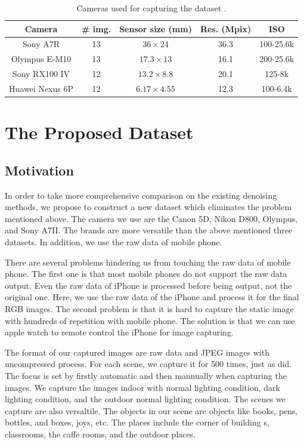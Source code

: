 \begin{table}[ht!]
\caption{Cameras used for capturing the dataset \cite{dnd2017}.}
\vspace{-5mm}
\label{tab6-3}
\begin{center}
\small
\renewcommand\arraystretch{1.2}
\begin{tabular*}{1\textwidth}{@{\extracolsep{\fill}}ccccc}
\hline
Camera
&
\# img.
&
Sensor size (mm)
&
Res. (Mpix)
&
ISO
\\
\hline
Sony A7R & 13  & $36\times24$  & 36.3  & 100-25.6k
\\
\hline
Olympus E-M10 & 13  & $17.3\times13$  & 16.1  & 200-25.6k 
\\
\hline   
Sony RX100 IV & 12 & $13.2\times8.8$  & 20.1  & 125-8k 
\\
\hline   
Huawei Nexus 6P & 12 & $6.17\times4.55$  & 12.3  & 100-6.4k 
\\
\hline
\end{tabular*}
\end{center}
\end{table}


\section{The Proposed Dataset}

\subsection{Motivation}

In order to take more comprehensive comparison on the existing denoising methods, we propose to construct a new dataset which eliminates the problem mentioned above. The camera we use are the Canon 5D, Nikon D800, Olympus, and Sony A7II. The brands are more versatile than the above mentioned three datasets. In addition, we use the raw data of mobile phone. 

There are several problems hindering us from touching the raw data of mobile phone. The first one is that most mobile phones do not support the raw data output. Even the raw data of  iPhone is processed before being output, not the original one. Here, we use the raw data of the iPhone and process it for the final RGB images. The second problem is that it is hard to capture the static image with hundreds of repetition with mobile phone. The solution is that we can use apple watch to remote control the iPhone for image capturing. 

The format of our captured images are raw data and JPEG images with uncompressed process. For each scene, we capture it for 500 times, just as \cite{crosschannel2016} did. The focus is set by firstly automatic and then mannually when capturing the images. We capture the images indoor with normal lighting condition, dark lighting condition, and the outdoor normal lighting condition. The scenes we capture are also versaltile. The objects in our scene are objects like books, pens, bottles, and boxes, joys, etc. The places include the corner of building s, classrooms, the caffe rooms, and the outdoor places.

